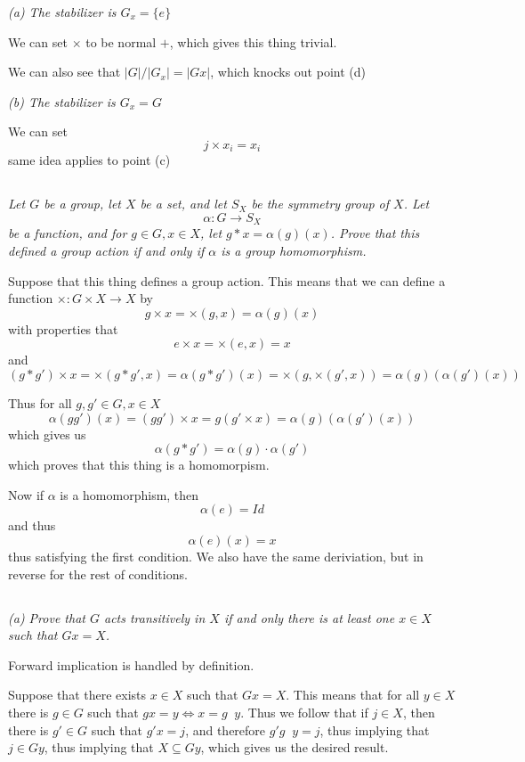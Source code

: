 \documentclass[11pt,oneside,titlepage]{book}
\DeclareMathOperator \inv {^{-1}}
\DeclareMathOperator \lra {\Leftrightarrow}
\newcommand{\set}[1]{\{ #1 \}}
\begin{document}
\textit{(a) The stabilizer is $G_x = \set{e}$}

We can set $\times$ to be normal $+$, which gives this thing trivial.

We can also see that $|G| / |G_x| = |Gx|$, which knocks out point (d)

\textit{(b) The stabilizer is $G_x = G$}

We can set
$$j \times x_i = x_i$$
same idea applies to point (c)

\subsection{}

\textit{Let $G$ be a group, let $X$ be a set, and let $S_X$ be the
  symmetry group of $X$. Let
  $$\alpha: G \to S_X$$
  be a function, and for $g \in G, x \in X$, let $g * x = \alpha
  (g)(x)$. Prove that this defined a group action if and only if $\alpha$
  is a group homomorphism.}

Suppose that this thing defines a group action. This means that
we can define a function $\times: G \times X \to X$ by
$$g \times x = \times(g, x) = \alpha(g)(x)$$
with properties that
$$e \times x = \times (e, x) = x$$
and
$$(g * g')  \times x = \times(g * g', x) = \alpha (g * g')(x)
= \times(g, \times (g', x)) = \alpha(g)(\alpha(g')(x))$$

Thus for all $g, g' \in G, x \in X$
$$ \alpha(g  g')(x) = (g g') \times x =
g (g' \times x) = \alpha(g)( \alpha(g')(x))$$
which gives us
$$\alpha(g * g') = \alpha(g) \cdot \alpha(g')$$
which proves that this thing is a homomorpism.

Now if $\alpha$ is a homomorphism, then
$$\alpha(e) = Id$$
and thus
$$\alpha(e)(x) = x$$
thus satisfying the first condition. We also have the same
deriviation, but in reverse for the rest of conditions.

\subsection{}

\textit{(a) Prove that $G$ acts transitively in $X$ if and only there
  is at least one $x \in X$ such that $Gx = X$.}

Forward implication is handled by definition.

Suppose that there exists $x \in X$ such that $Gx = X$. This means
that for all $y \in X$ there is $g \in G$ such that $gx = y \lra x = g\inv y$.
Thus we follow that if $j \in X$, then there is $g' \in G$ such that
$g'x = j$, and therefore $g' g\inv y = j$, thus implying that $j \in
Gy$, thus implying that $X \subseteq Gy$, which gives us the desired result.
\end{document}
